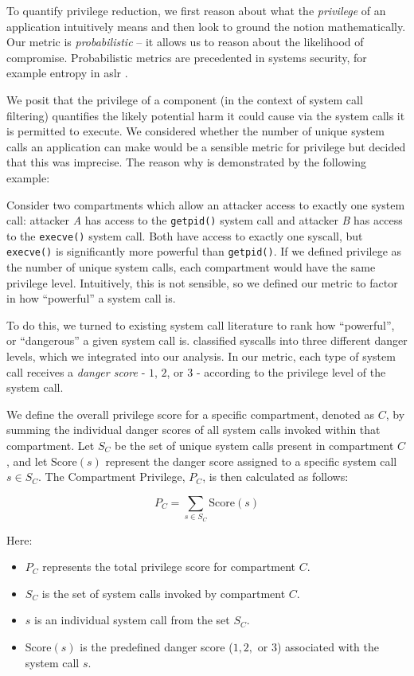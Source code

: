 To quantify privilege reduction, we first reason about what the 
\textit{privilege} of an application intuitively means and then look to ground
the notion mathematically. Our metric is \textit{probabilistic} -- it allows us
to reason about the likelihood of compromise. Probabilistic metrics are
precedented in systems security, for example entropy in \ac{aslr} \cite{aslr_entropy}.

We posit that the privilege of a component (in the context of system call
filtering) quantifies the likely potential harm it could cause via the system calls
it is permitted to execute. We considered whether the number of unique
system calls an application can make would be a sensible metric for privilege
but decided that this was imprecise. The reason why is
demonstrated by the following example:

Consider two compartments which allow an attacker access to
exactly one system call: attacker \textit{A} has access to the 
\texttt{getpid()} system call and attacker \textit{B} has access to the
\texttt{execve()} system call. Both have access to exactly one syscall, but
\texttt{execve()} is significantly more powerful than \texttt{getpid()}.
If we defined privilege as the number of unique system calls, each compartment
would have the same privilege level. Intuitively, this is not sensible, so we
defined our metric to factor in how ``powerful'' a system call is. 

To do this, we turned to existing system call literature to rank
how ``powerful'', or ``dangerous'' a given system call is. 
\textcite{SYSCALL_RANKINGS} classified syscalls into three different danger
levels, which we integrated into our analysis. In our metric, each   type of
system call receives a \textit{danger score} - $1$, $2$, or $3$ - according
to the privilege level of the system call.

We define the overall privilege score for a specific compartment, denoted as
$C$, by summing the individual danger scores of all system calls invoked
within that compartment. Let $S_C$ be the set of unique system calls present
in compartment $C$, and let $\mathrm{Score}(s)$ represent the danger score
assigned to a specific system call $s \in S_C$. The Compartment Privilege, $P_C
$, is then calculated as follows:  

\begin{equation} \label{eqn:privilege} 
    P_C = \sum_{s \in S_C} \mathrm{Score}(s) 
\end{equation} 

Here:
\begin{itemize}
    \item $P_C$ represents the total privilege score for compartment $C$.
    \item $S_C$ is the set of system calls invoked by compartment $C$.
    \item $s$ is an individual system call from the set $S_C$.
    \item $\mathrm{Score}(s)$ is the predefined danger score ($1, 2,$ or $3$)
        associated with the system call $s$.
\end{itemize}


